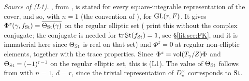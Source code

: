 \emph{Source of (L1).} \cite[\S25.1, Theorem]{FK86}, from \cite[Theorem~K]{Kaz86}, is stated for every square-integrable representation of the cover, and so, with $n=1$ (the convention of \cite[\S8, Remark~(3)]{FK86}), for $\mathrm{GL}(r,F)$. It gives $\Phi^z(\gamma,f_{\mathrm{St}})=\overline{\Theta_{\mathrm{St}}(\gamma)}$ on the regular elliptic set (\cite{FK86} print this without the complex conjugate; the conjugate is needed for $\operatorname{tr}\mathrm{St}(f_{\mathrm{St}})=1$, see \S\ref{lit:sec:FK}, and it is immaterial here since $\Theta_{\mathrm{St}}$ is real on that set) and $\Phi^z=0$ at regular non-elliptic elements, together with the trace properties. Since $\Phi^z=\operatorname{vol}(T_\gamma/Z)\Phi$ and $\Theta_{\mathrm{St}}=(-1)^{r-1}$ on the regular elliptic set, this is (L1). The value of $\Theta_{\mathrm{St}}$ follows from \cite[Theorem~2.2]{Bad08} with $n=1$, $d=r$, since the trivial representation of $D_v^\times$ corresponds to $\mathrm{St}$.

